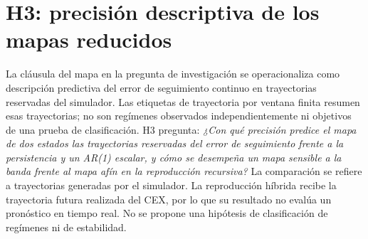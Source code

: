 \section{H3: precisión descriptiva de los mapas reducidos}

La cláusula del mapa en la pregunta de investigación se operacionaliza como descripción predictiva del error de seguimiento continuo en trayectorias reservadas del simulador. Las etiquetas de trayectoria por ventana finita resumen esas trayectorias; no son regímenes observados independientemente ni objetivos de una prueba de clasificación. H3 pregunta:
\emph{¿Con qué precisión predice el mapa de dos estados las trayectorias reservadas del error de seguimiento frente a la persistencia y un AR(1) escalar, y cómo se desempeña un mapa sensible a la banda frente al mapa afín en la reproducción recursiva?}
La comparación se refiere a trayectorias generadas por el simulador. La reproducción híbrida recibe la trayectoria futura realizada del CEX, por lo que su resultado no evalúa un pronóstico en tiempo real. No se propone una hipótesis de clasificación de regímenes ni de estabilidad.
